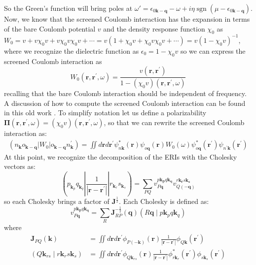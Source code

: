 \documentclass[12pt]{article}
\begin{document}
    So the Green's function will bring poles at \(\omega' = \epsilon_{0 \mathbf{k-q}} - \omega+ i\eta\operatorname{sgn}(\mu - \epsilon_{0 \mathbf{k-q}})\).
    Now, we know that the screened Coulomb interaction has the expansion in terms of the bare Coulomb potential \(v\) and the density response function \(\chi_0\) as \(W_0 = v + v\chi_0 v + v\chi_0 v\chi_0 v + \cdots = v\left(1 + \chi_0 v + \chi_0 v \chi_0 v + \cdots\right) = v\left(1 - \chi_0 v\right)^{-1}\), where we recognize the dielectric function as \(\epsilon_0 = 1 - \chi_0 v\) so we can express the screened Coulomb interaction as
    \begin{equation}
    W_0(\mathbf{r}, \mathbf{r}^{\prime}, \omega) = \frac{v(\mathbf{r}, \mathbf{r}^{\prime})}{1 - \left(\chi_0v\right)(\mathbf{r}, \mathbf{r}^{\prime}, \omega)}
    \end{equation}
    recalling that the bare Coulomb interaction should be independent of frequency. A discussion of how to compute the screened Coulomb interaction can be found in this old work \cite{Onida2002-pw}. To simplify notation let us define a polarizability $\boldsymbol{\Pi}\left(\mathbf{r}, \mathbf{r}^{\prime}, \omega\right) = \left(\chi_0 v\right)(\mathbf{r}, \mathbf{r}^{\prime}, \omega)$, so that we can rewrite the screened Coulomb interaction as:
\begin{align}
    (n_{\mathbf{k}}o_{\mathbf{k-q}}|W_0|o_{\mathbf{k-q}}n^\prime_{\mathbf{k}}) = \iint d \mathbf{r} d \mathbf{r}^\prime \psi_{n\mathbf{k}}^{*}(\mathbf{r}) \psi_{o \mathbf{q}}(\mathbf{r}) W_0(\omega ) \psi_{o \mathbf{q}}^{*}\left(\mathbf{r}^{\prime}\right) \psi_{n^\prime\mathbf{k}}(\mathbf{r}^\prime)
\end{align}
At this point, we recognize the decomposition of the ERIs with the Cholesky vectors as:
\begin{equation}
    (p_{\mathbf{k}_p} q_{\mathbf{k}_q} |\frac{1}{|\mathbf{r}-\mathbf{r}^\prime|} |r_{\mathbf{k}_r} s_{\mathbf{k}_s}) = \sum_{PQ} v_{P{\mathbf{q}}}^{p\mathbf{k_p}q\mathbf{k_q}} v_{Q{(\mathbf{-q})}}^{r\mathbf{k_r}s\mathbf{k_s}}
\end{equation}
so each Cholesky brings a factor of $\mathbf{J}^{\frac{1}{2}}$. Each Cholesky is defined as:
\begin{equation}
    v_{P{\mathbf{q}}}^{p\mathbf{k_p}q\mathbf{k_q}} = \sum_{R} \mathbf{J}_{RP}^{-\frac{1}{2}}(\mathbf{q}) \left(R \mathbf{q} \mid p \mathbf{k}_p q \mathbf{k}_q\right)
\end{equation}
where
\begin{equation}
\begin{aligned}
\mathbf{J}_{PQ}(\mathbf{k}) & =\iint d \mathbf{r} d \mathbf{r}^{\prime} \phi_{P(-\mathbf{k})}(\mathbf{r}) \frac{1}{\left|\mathbf{r}-\mathbf{r}^{\prime}\right|} \phi_{Q \mathbf{k}}\left(\mathbf{r}^{\prime}\right) \\
\left(Q \mathbf{k}_{r s} \mid r \mathbf{k}_r s \mathbf{k}_s\right) & =\iint d \mathbf{r} d \mathbf{r}^{\prime} \phi_{Q \mathbf{k}_{r s}}(\mathbf{r}) \frac{1}{\left|\mathbf{r}-\mathbf{r}^{\prime}\right|} \phi_{r \mathbf{k}_r}^*\left(\mathbf{r}^{\prime}\right) \phi_{s \mathbf{k}_s}\left(\mathbf{r}^{\prime}\right)
\end{aligned}
\end{equation}
\end{document}

